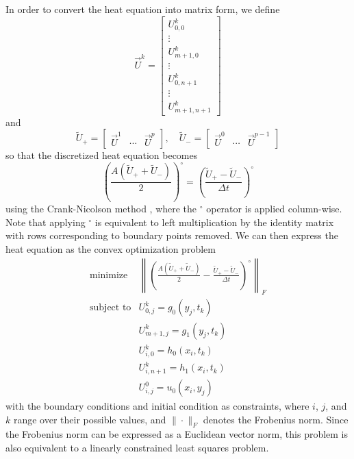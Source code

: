 \documentclass[conference]{IEEEtran}
\begin{document}
In order to convert the heat equation into matrix form, we define
\begin{equation}
  \vec{U}^k = \begin{bmatrix}
    U_{0,0}^k \\ \vdots \\ U_{m+1,0}^k \\ \vdots \\ U_{0,n+1}^k \\ \vdots \\ U_{m+1,n+1}^k
  \end{bmatrix}
\end{equation}
and
\begin{equation}
  \widetilde{U}_+ = \begin{bmatrix}
    \vec{U}^1 & \cdots & \vec{U}^p
  \end{bmatrix}, \quad \widetilde{U}_- = \begin{bmatrix}
    \vec{U}^0 & \cdots & \vec{U}^{p-1}
  \end{bmatrix}
\end{equation}
so that the discretized heat equation becomes
\begin{equation}
  \left(\frac{A(\widetilde{U}_+ + \widetilde{U}_-)}{2}\right)^\circ = \left(\frac{\widetilde{U}_+ - \widetilde{U}_-}{\Delta t}\right)^\circ
\end{equation}
using the Crank-Nicolson method , where the ${}^\circ$ operator is applied column-wise. Note that applying ${}^\circ$ is equivalent to left multiplication by the identity matrix with rows corresponding to boundary points removed. We can then express the heat equation as the convex optimization problem
\begin{equation}
  \begin{array}{lll}
    \text{minimize} & \left\|\left(\frac{A(\widetilde{U}_+ + \widetilde{U}_-)}{2} - \frac{\widetilde{U}_+ - \widetilde{U}_-}{\Delta t}\right)^\circ\right\|_F \\
    \text{subject to} & U_{0,j}^k = g_0(y_j, t_k) \\
    & U_{m+1,j}^k = g_1(y_j, t_k) \\
    & U_{i,0}^k = h_0(x_i, t_k) \\
    & U_{i,n+1}^k = h_1(x_i, t_k) \\
    & U_{i,j}^0 = u_0(x_i, y_j)
  \end{array}
\end{equation}
with the boundary conditions and initial condition as constraints, where $i$, $j$, and $k$ range over their possible values, and $\|\cdot\|_F$ denotes the Frobenius norm. Since the Frobenius norm can be expressed as a Euclidean vector norm, this problem is also equivalent to a linearly constrained least squares problem.
\end{document}
